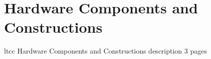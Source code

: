 \section{Hardware Components and Constructions}

ltcc Hardware Components and Constructions description 3 pages

